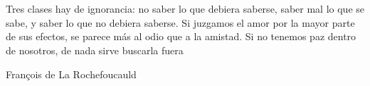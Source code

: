\documentclass[
11pt, %
spanish,
singlespacing, %
parskip, %
headsepline, %
]{MastersDoctoralThesis} %
\begin{document}

%
%
%



%
%  
%

\chapter*{ }

{\larger

\hspace{20mm}Tres clases hay de ignorancia: no saber lo que debiera saberse, saber mal lo que se sabe, y saber lo que no debiera saberse. Si juzgamos el amor por la mayor parte de sus efectos, se parece más al odio que a la amistad. Si no tenemos paz dentro de nosotros, de nada sirve buscarla fuera

\vspace{10mm}
\hspace{7.6cm} François de La Rochefoucauld



}
\end{document}
